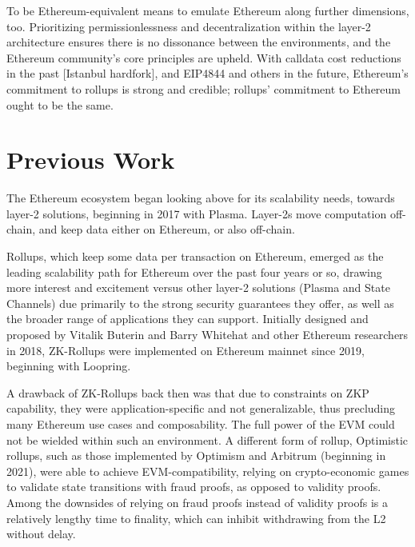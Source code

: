 \documentclass[9pt,oneside]{amsart}
\begin{document}
\begin{multicols}{2}
To be Ethereum-equivalent means to emulate Ethereum along further dimensions, too. Prioritizing permissionlessness and decentralization within the layer-2 architecture ensures there is no dissonance between the environments, and the Ethereum community’s core principles are upheld. With calldata cost reductions in the past [Istanbul hardfork], and EIP4844 and others in the future, Ethereum's commitment to rollups is strong and credible; rollups' commitment to Ethereum ought to be the same.

\color{black}

\section{Previous Work}

\color{black}
The Ethereum ecosystem began looking above for its scalability needs, towards layer-2 solutions, beginning in 2017 with Plasma\cite{plasma}. Layer-2s move computation off-chain, and keep data either on Ethereum, or also off-chain.

Rollups, which keep some data per transaction on Ethereum, emerged as the leading scalability path for Ethereum over the past four years or so, drawing more interest and excitement versus other layer-2 solutions (Plasma and State Channels) due primarily to the strong security guarantees they offer, as well as the broader range of applications they can support. Initially designed and proposed by Vitalik Buterin\cite{vitalik-rollup} and Barry Whitehat\cite{barry-rollup} and other Ethereum researchers in 2018, ZK-Rollups were implemented on Ethereum mainnet since 2019, beginning with Loopring. 

A drawback of ZK-Rollups back then was that due to constraints on ZKP capability, they were application-specific and not generalizable, thus precluding many Ethereum use cases and composability. The full power of the EVM could not be wielded within such an environment. A different form of rollup, Optimistic rollups, such as those implemented by Optimism and Arbitrum (beginning in 2021), were able to achieve EVM-compatibility, relying on crypto-economic games to validate state transitions with fraud proofs, as opposed to validity proofs. Among the downsides of relying on fraud proofs instead of validity proofs is a relatively lengthy time to finality, which can inhibit withdrawing from the L2 without delay. 


\end{multicols}
\end{document}
